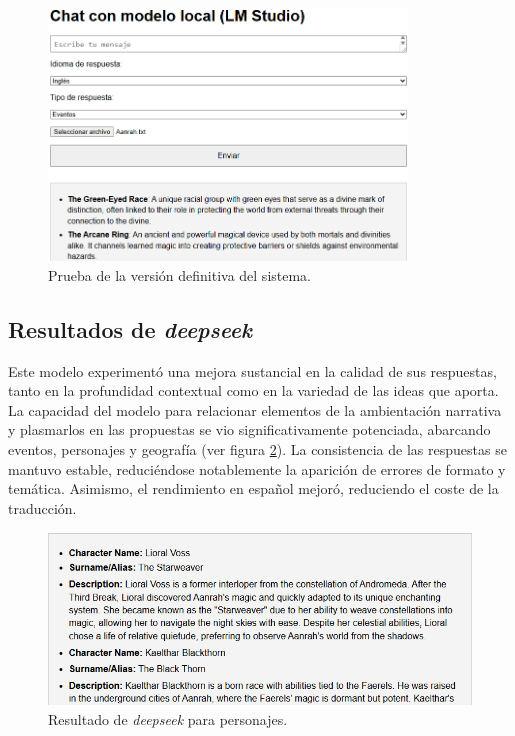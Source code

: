 \begin{figure}[htbp]
	\centering
	\includegraphics[width=0.85\textwidth]{./Figures/full-promp-testing.png}
	\caption{Prueba de la versión definitiva del sistema.}
	\label{fig:full-prompt-test}
\end{figure}

\subsection{Resultados de \textit{deepseek}}
Este modelo experimentó una mejora sustancial en la calidad de sus respuestas, tanto en la profundidad
contextual como en la variedad de las ideas que aporta.
La capacidad del modelo para relacionar elementos de la ambientación narrativa y
plasmarlos en las propuestas se vio significativamente potenciada, abarcando eventos, personajes y geografía
(ver figura \ref{fig:deepseek-prompt-char}).
La consistencia de las respuestas se mantuvo estable,
reduciéndose notablemente la aparición de errores de formato y temática.
Asimismo, el rendimiento en español mejoró, reduciendo el coste de la traducción.

\begin{figure}[htbp]
	\centering
	\includegraphics[width=1\textwidth]{./Figures/deepseek-prompt-characters.png}
	\caption{Resultado de \textit{deepseek} para personajes.}
	\label{fig:deepseek-prompt-char}
\end{figure}
\pagebreak
